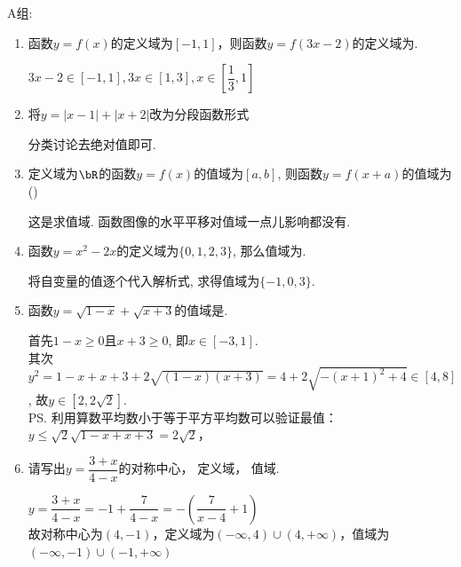A组: 
\begin{enumerate}

\item 函数$y = f(x)$的定义域为$[-1, 1]$，则函数$y = f(3x-2)$的定义域为\blkda{$[\dfrac{1}{3}, 1]$}.
\begin{jieda}
$3x-2 \in [-1, 1], 3x \in [1, 3], x \in [\dfrac{1}{3}, 1]$
\end{jieda} 

\item 将$y = |x-1| + |x+2|$改为分段函数形式

\begin{jieda}
分类讨论去绝对值即可.
\end{jieda} 

\item 定义域为$\bR$的函数$y=f(x)$的值域为$[a,b]$, 则函数$y=f(x+a)$的值域为\dotfill()
\xx{$[2a,a+b]$}{$[a,b]$}{$[0,b-a]$}{$[-a,a+b]$}
\begin{jieda}
这是求值域. 函数图像的水平平移对值域一点儿影响都没有. 
\end{jieda}

\item 函数$y=x^2-2x$的定义域为$\{0,1,2,3\}$, 那么值域为.
\begin{jieda}
将自变量的值逐个代入解析式, 求得值域为$\{-1,0,3\}$.
\end{jieda}

\item 函数$y=\sqrt{1-x}+\sqrt{x+3}$的值域是\blkda{$[2,2\sqrt{2}]$}.
\begin{jieda}
首先$1-x\geq0$且$ x+3\geq 0$, 即$x\in[-3,1]$. \\
其次$y^2=1-x+x+3+2\sqrt{(1-x)(x+3)}=4+2\sqrt{-(x+1)^2+4}\in[4,8]$, 
故$y\in[2,2\sqrt{2}]$. \\
\ps 利用算数平均数小于等于平方平均数可以验证最值：$y \leq \sqrt{2} \sqrt{1-x + x + 3} = 2\sqrt{2}$，
\end{jieda}

\item 请写出$y = \dfrac{3+x}{4-x}$的对称中心， 定义域， 值域.
\begin{jieda}
$y = \dfrac{3+x}{4-x} = -1 + \dfrac{7}{4-x} = -(\dfrac{7}{x-4} + 1)$ \\
故对称中心为$(4, -1)$，定义域为$(-\infty, 4) \cup (4, +\infty)$，值域为$(-\infty, -1) \cup (-1, +\infty)$
\end{jieda}
\begin{vspace_}
    \vsp[3]
\end{vspace_}

\end{enumerate}


